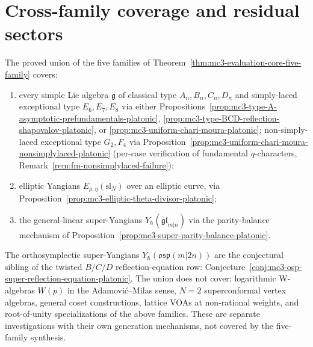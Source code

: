 \section{Cross-family coverage and residual sectors}
\label{sec:mc3-platonic-coverage}

\begin{corollary}
\label{cor:five-family-union-coverage}
%
The proved union of the five families of
Theorem~\ref{thm:mc3-evaluation-core-five-family} covers:
\begin{enumerate}[label=\textup{(\roman*)},nosep]
\item every simple Lie algebra $\mathfrak{g}$ of classical type
 $A_n, B_n, C_n, D_n$ and simply-laced exceptional type $E_6, E_7,
 E_8$ via either
 Propositions~\ref{prop:mc3-type-A-asymptotic-prefundamentals-platonic},
 \ref{prop:mc3-type-BCD-reflection-shapovalov-platonic}, or
 \ref{prop:mc3-uniform-chari-moura-platonic}; non-simply-laced
 exceptional type $G_2, F_4$ via
 Proposition~\ref{prop:mc3-uniform-chari-moura-nonsimplylaced-platonic}
 (per-case verification of fundamental $q$-characters,
 Remark~\ref{rem:fm-nonsimplylaced-failure});
\item elliptic Yangians $E_{\rho,\eta}(\mathrm{sl}_N)$ over an
 elliptic curve, via Proposition~\ref{prop:mc3-elliptic-theta-divisor-platonic};
\item the general-linear super-Yangians
 $Y_\hbar(\mathfrak{gl}_{m|n})$ via the parity-balance mechanism of
 Proposition~\ref{prop:mc3-super-parity-balance-platonic}.
\end{enumerate}
The orthosymplectic super-Yangians
$Y_\hbar(\mathfrak{osp}(m|2n))$ are the conjectural sibling of the
twisted $B/C/D$ reflection-equation row:
Conjecture~\ref{conj:mc3-osp-super-reflection-equation-platonic}.
The union does not cover: logarithmic W-algebras $W(p)$ in the
Adamovi\'c--Milas sense, $N=2$ superconformal vertex algebras,
general coset constructions, lattice VOAs at non-rational weights,
and root-of-unity specializations of the above families. These
are separate investigations with their own generation mechanisms,
not covered by the five-family synthesis.
\end{corollary}

